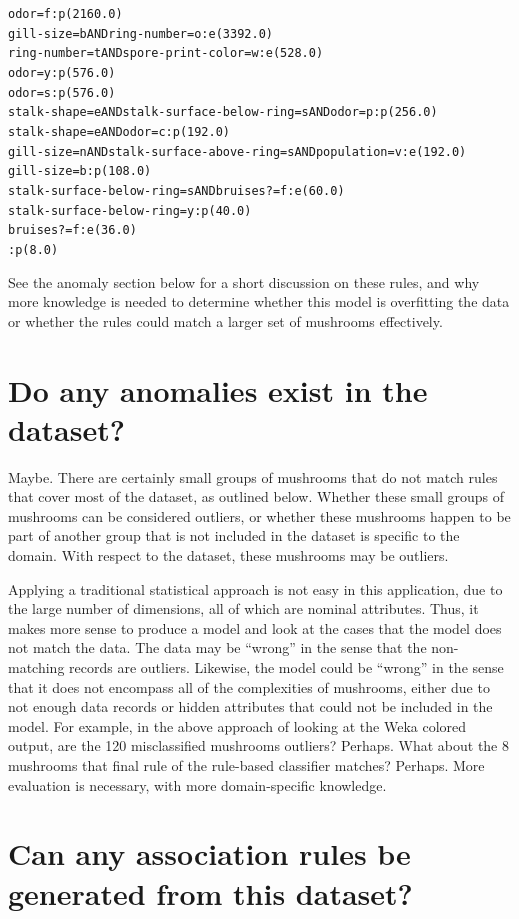 \documentclass[margin,letterpaper,11pt]{scrartcl}
\begin{document}
\begin{alltt}
odor = f: p (2160.0)
gill-size = b AND ring-number = o: e (3392.0)
ring-number = t AND spore-print-color = w: e (528.0)
odor = y: p (576.0)
odor = s: p (576.0)
stalk-shape = e AND stalk-surface-below-ring = s AND odor = p: p (256.0)
stalk-shape = e AND odor = c: p (192.0)
gill-size = n AND stalk-surface-above-ring = s AND population = v: e (192.0)
gill-size = b: p (108.0)
stalk-surface-below-ring = s AND bruises? = f: e (60.0)
stalk-surface-below-ring = y: p (40.0)
bruises? = f: e (36.0)
: p (8.0)
\end{alltt}

See the anomaly section below for a short discussion on these rules, and why
more knowledge is needed to determine whether this model is overfitting the
data or whether the rules could match a larger set of mushrooms effectively.

\section{Do any anomalies exist in the dataset?}

Maybe. There are certainly small groups of mushrooms that do not match rules that
cover most of the dataset, as outlined below. Whether these small groups of
mushrooms can be considered outliers, or whether these mushrooms happen to be
part of another group that is not included in the dataset is specific to the
domain. With respect to the dataset, these mushrooms may be outliers.

Applying a traditional statistical approach is not easy in this application,
due to the large number of dimensions, all of which are nominal attributes.
Thus, it makes more sense to produce a model and look at the cases that the
model does not match the data. The data may be ``wrong'' in the sense that the
non-matching records are outliers. Likewise, the model could be ``wrong'' in
the sense that it does not encompass all of the complexities of mushrooms,
either due to not enough data records or hidden attributes that could not be
included in the model. For example, in the above approach of looking at the
Weka colored output, are the 120 misclassified mushrooms outliers? Perhaps.
What about the 8 mushrooms that final rule of the rule-based classifier
matches? Perhaps. More evaluation is necessary, with more domain-specific
knowledge.

\section{Can any association rules be generated from this dataset?}
\end{document}
